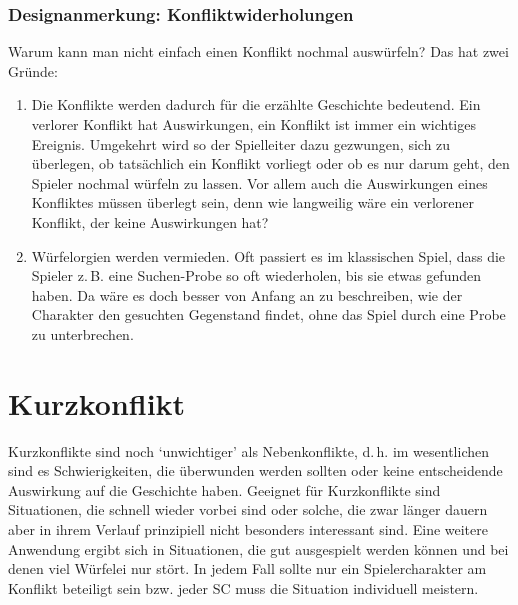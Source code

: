 \begin{design}
\subsubsection{Designanmerkung: Konfliktwiderholungen}
Warum kann man nicht einfach einen Konflikt nochmal auswürfeln? Das hat zwei Gründe:
\begin{enumerate}
  \item Die Konflikte werden dadurch für die erzählte Geschichte bedeutend. Ein verlorer Konflikt hat Auswirkungen, ein Konflikt ist immer ein wichtiges Ereignis. Umgekehrt wird so der Spielleiter dazu gezwungen, sich zu überlegen, ob tatsächlich ein Konflikt vorliegt oder ob es nur darum geht, den Spieler nochmal würfeln zu lassen. Vor allem auch die Auswirkungen eines Konfliktes müssen überlegt sein, denn wie langweilig wäre ein verlorener Konflikt, der keine Auswirkungen hat?
  \item Würfelorgien werden vermieden. Oft passiert es im klassischen Spiel, dass die Spieler z.\,B. eine Suchen-Probe so oft wiederholen, bis sie etwas gefunden haben. Da wäre es doch besser von Anfang an zu beschreiben, wie der Charakter den gesuchten Gegenstand findet, ohne das Spiel durch eine Probe zu unterbrechen.
\end{enumerate}
\end{design}



\section{Kurzkonflikt}\label{Sec:Kurzkonflikt}
Kurzkonflikte sind noch `unwichtiger' als Nebenkonflikte, d.\,h. im wesentlichen sind es Schwierigkeiten, die überwunden werden sollten oder keine entscheidende Auswirkung auf die Geschichte haben. Geeignet für Kurzkonflikte sind Situationen, die schnell wieder vorbei sind oder solche, die zwar länger dauern aber in ihrem Verlauf prinzipiell nicht besonders interessant sind. Eine weitere Anwendung ergibt sich in Situationen, die gut ausgespielt werden können und bei denen viel Würfelei nur stört. In jedem Fall sollte nur ein Spielercharakter am Konflikt beteiligt sein bzw. jeder SC muss die Situation individuell meistern.

